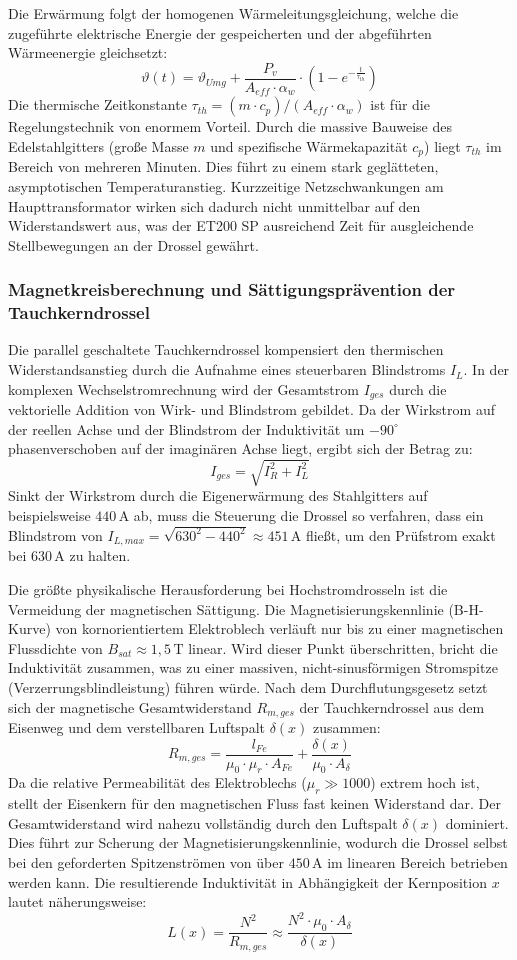 Die Erwärmung folgt der homogenen Wärmeleitungsgleichung, welche die zugeführte elektrische Energie der gespeicherten und der abgeführten Wärmeenergie gleichsetzt:
$$\vartheta(t) = \vartheta_{Umg} + \frac{P_v}{A_{eff} \cdot \alpha_w} \cdot \left( 1 - e^{-\frac{t}{\tau_{th}}} \right)$$
Die thermische Zeitkonstante $\tau_{th} = (m \cdot c_p) / (A_{eff} \cdot \alpha_w)$ ist für die Regelungstechnik von enormem Vorteil. Durch die massive Bauweise des Edelstahlgitters (große Masse $m$ und spezifische Wärmekapazität $c_p$) liegt $\tau_{th}$ im Bereich von mehreren Minuten. Dies führt zu einem stark geglätteten, asymptotischen Temperaturanstieg. Kurzzeitige Netzschwankungen am Haupttransformator wirken sich dadurch nicht unmittelbar auf den Widerstandswert aus, was der ET200 SP ausreichend Zeit für ausgleichende Stellbewegungen an der Drossel gewährt.

\subsubsection{Magnetkreisberechnung und Sättigungsprävention der Tauchkerndrossel}
\label{sec:auslegung_drossel}

Die parallel geschaltete Tauchkerndrossel kompensiert den thermischen Widerstandsanstieg durch die Aufnahme eines steuerbaren Blindstroms $I_L$. In der komplexen Wechselstromrechnung wird der Gesamtstrom $I_{ges}$ durch die vektorielle Addition von Wirk- und Blindstrom gebildet. Da der Wirkstrom auf der reellen Achse und der Blindstrom der Induktivität um $-90^\circ$ phasenverschoben auf der imaginären Achse liegt, ergibt sich der Betrag zu:
$$I_{ges} = \sqrt{I_R^2 + I_L^2}$$
Sinkt der Wirkstrom durch die Eigenerwärmung des Stahlgitters auf beispielsweise $440\,\text{A}$ ab, muss die Steuerung die Drossel so verfahren, dass ein Blindstrom von $I_{L,max} = \sqrt{630^2 - 440^2} \approx 451\,\text{A}$ fließt, um den Prüfstrom exakt bei 630\,A zu halten.

Die größte physikalische Herausforderung bei Hochstromdrosseln ist die Vermeidung der magnetischen Sättigung. Die Magnetisierungskennlinie (B-H-Kurve) von kornorientiertem Elektroblech verläuft nur bis zu einer magnetischen Flussdichte von $B_{sat} \approx 1,5\,\text{T}$ linear. Wird dieser Punkt überschritten, bricht die Induktivität zusammen, was zu einer massiven, nicht-sinusförmigen Stromspitze (Verzerrungsblindleistung) führen würde. 
Nach dem Durchflutungsgesetz setzt sich der magnetische Gesamtwiderstand $R_{m,ges}$ der Tauchkerndrossel aus dem Eisenweg und dem verstellbaren Luftspalt $\delta(x)$ zusammen:
$$R_{m,ges} = \frac{l_{Fe}}{\mu_0 \cdot \mu_r \cdot A_{Fe}} + \frac{\delta(x)}{\mu_0 \cdot A_{\delta}}$$
Da die relative Permeabilität des Elektroblechs ($\mu_r \gg 1000$) extrem hoch ist, stellt der Eisenkern für den magnetischen Fluss fast keinen Widerstand dar. Der Gesamtwiderstand wird nahezu vollständig durch den Luftspalt $\delta(x)$ dominiert. Dies führt zur Scherung der Magnetisierungskennlinie, wodurch die Drossel selbst bei den geforderten Spitzenströmen von über $450\,\text{A}$ im linearen Bereich betrieben werden kann. Die resultierende Induktivität in Abhängigkeit der Kernposition $x$ lautet näherungsweise:
$$L(x) = \frac{N^2}{R_{m,ges}} \approx \frac{N^2 \cdot \mu_0 \cdot A_{\delta}}{\delta(x)}$$

